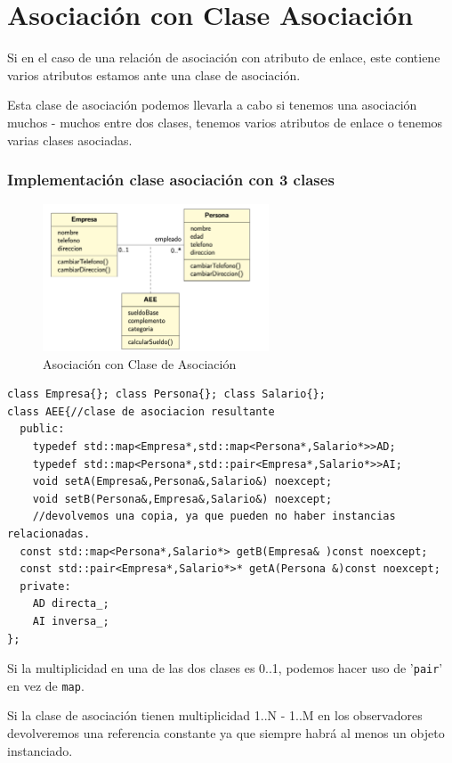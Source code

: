 \chapter{ Asociación con Clase Asociación}
Si en el caso de una relación de asociación con atributo de enlace, este contiene varios atributos 
estamos ante una clase de asociación.

Esta clase de asociación podemos llevarla a cabo si tenemos una asociación muchos - muchos 
entre dos clases, tenemos varios atributos de enlace o tenemos varias clases asociadas.
\subsection{Implementación clase asociación con 3 clases}
\begin{figure}[h]
    \centering
    \includegraphics[width=0.6\textwidth]{Imagenes/AClS.png}
    \caption{Asociación con Clase de Asociación}
\end{figure}
\begin{center}
	\begin{lstlisting}[frame=single]
class Empresa{}; class Persona{}; class Salario{};
class AEE{//clase de asociacion resultante
  public:
    typedef std::map<Empresa*,std::map<Persona*,Salario*>>AD;
    typedef std::map<Persona*,std::pair<Empresa*,Salario*>>AI;
    void setA(Empresa&,Persona&,Salario&) noexcept;
    void setB(Persona&,Empresa&,Salario&) noexcept;
    //devolvemos una copia, ya que pueden no haber instancias relacionadas.
  const std::map<Persona*,Salario*> getB(Empresa& )const noexcept;
  const std::pair<Empresa*,Salario*>* getA(Persona &)const noexcept;
  private:
    AD directa_; 
    AI inversa_;
};
\end{lstlisting}
\end{center}
Si la multiplicidad en una de las dos clases es 0..1, podemos hacer uso de '\texttt{pair}' en vez de \texttt{map}.

Si la clase de asociación tienen multiplicidad 1..N - 1..M en los observadores devolveremos una referencia constante ya que siempre habrá al menos un objeto instanciado.
